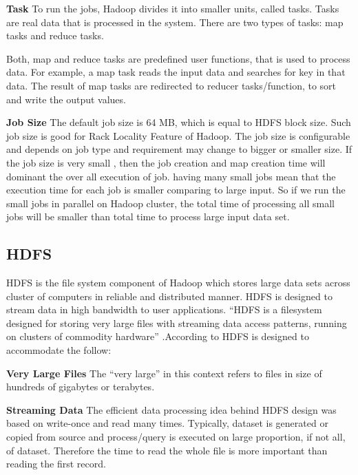 \textbf{Task}‌ To run the jobs, Hadoop divides it into smaller units, called tasks. Tasks are real data that is processed in the system. There are two types of tasks: map tasks and reduce tasks.

Both, map and reduce tasks are predefined user functions, that is used to process data. For example, a map task reads the input data and searches for key in that data. The result of map tasks are redirected to reducer tasks/function, to sort and write the output values. 

\textbf{Job Size}  
 The default job size is 64 MB, which is equal to HDFS block size. Such job size is good for Rack Locality Feature of Hadoop. The job size is configurable and depends on job type and requirement may change to bigger or smaller size. If the job size is very small , then the job creation and map creation time will dominant the over all execution of job. having many small jobs mean that the execution time for each job is smaller comparing to large input. So if we run the small jobs in parallel on Hadoop cluster, the total time of processing all small jobs will be smaller than total time to process large input data set.\\ 


\subsection{HDFS}


 HDFS is the file system component of Hadoop which stores large data sets across cluster of computers in reliable and distributed manner. HDFS is designed to stream data in high bandwidth to user applications.
“HDFS is a filesystem designed for storing very large files with streaming data access patterns, running on clusters of commodity hardware” \cite{tom3}.According to \cite{tom3} HDFS‌ is designed to accommodate the follow:

\textbf{Very Large Files} 
  The “very large” in this context refers to files in size of hundreds of gigabytes or terabytes.

\textbf{Streaming Data}
  The efficient data processing idea behind HDFS design was based on write-once and read many times. Typically, dataset is generated or copied from source and process/query is executed on large proportion, if not all, of dataset. Therefore  the time to read the whole file is more important than reading the first record. 
  
